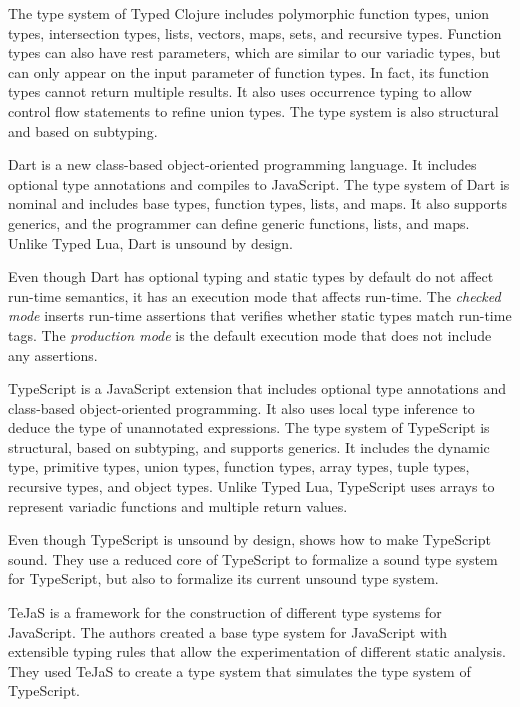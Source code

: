 The type system of Typed Clojure includes polymorphic function types,
union types, intersection types, lists, vectors, maps, sets, and recursive types.
Function types can also have rest parameters, which are similar
to our variadic types, but can only appear on the input parameter
of function types.
In fact, its function types cannot return multiple results.
It also uses occurrence typing to allow control flow statements to
refine union types.
The type system is also structural and based on subtyping.

Dart \citep{dart} is a new class-based object-oriented programming
language.
It includes optional type annotations and compiles to JavaScript.
The type system of Dart is nominal and includes base types,
function types, lists, and maps.
It also supports generics, and the programmer can define
generic functions, lists, and maps.
Unlike Typed Lua, Dart is unsound by design.

Even though Dart has optional typing and static types by
default do not affect run-time semantics, it has an
execution mode that affects run-time.
The \emph{checked mode} inserts run-time assertions that
verifies whether static types match run-time tags.
The \emph{production mode} is the default execution mode
that does not include any assertions.

TypeScript \citep{typescript} is a JavaScript extension
that includes optional type annotations and class-based
object-oriented programming.
It also uses local type inference to deduce the type
of unannotated expressions.
The type system of TypeScript is structural, based
on subtyping, and supports generics.
It includes the dynamic type, primitive types, union types,
function types, array types, tuple types, recursive types, and
object types.
Unlike Typed Lua, TypeScript uses arrays to represent variadic
functions and multiple return values.

Even though TypeScript is unsound by design,
\citet{bierman2014typescript} shows how to make TypeScript sound.
They use a reduced core of TypeScript to formalize a
sound type system for TypeScript, but also to formalize
its current unsound type system.

TeJaS \citep{lerner2013tejas} is a framework for the construction of
different type systems for JavaScript.
The authors created a base type system for JavaScript with
extensible typing rules that allow the experimentation of
different static analysis.
They used TeJaS to create a type system that simulates the
type system of TypeScript.

